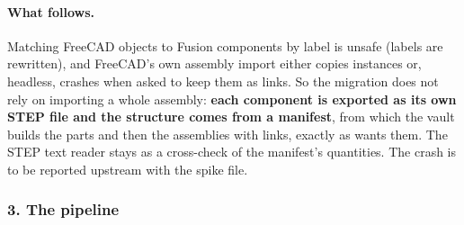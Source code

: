 \paragraph{What follows.} Matching FreeCAD objects to Fusion components by label is unsafe (labels are rewritten), and
FreeCAD's own assembly import either copies instances or, headless, crashes when asked to keep them as links. So the
migration does not rely on importing a whole assembly: \textbf{each component is exported as its own STEP file and the
structure comes from a manifest}, from which the vault builds the parts and then the assemblies with links, exactly
as  wants them. The STEP text reader stays as a cross-check of the manifest's quantities. The crash is
to be reported upstream with the spike file.

\subsubsection*{3. The pipeline}

